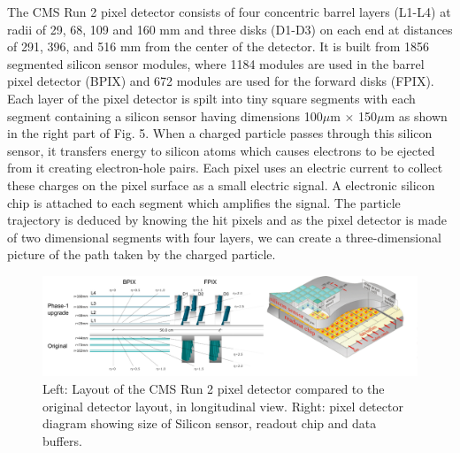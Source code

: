 The CMS Run 2 pixel detector consists of four concentric barrel layers (L1-L4) at radii of 29, 68, 109 and 160 mm and three disks (D1-D3) on each end at distances of 291, 396, and 516 mm from the center of the detector. It is built from 1856 segmented silicon sensor modules, where 1184 modules are used in the barrel pixel detector (BPIX) and 672 modules are used for the forward disks (FPIX). \\

Each layer of the pixel detector is spilt into tiny square segments with each segment containing a silicon sensor having dimensions 100$\mu$m $\times$ 150$\mu$m as shown in the right part of Fig. 5. When a charged particle passes through this silicon sensor, it transfers energy to silicon atoms which causes electrons to be ejected from it creating electron-hole pairs. Each pixel uses an electric current to collect these charges on the pixel surface as a small electric signal. A electronic silicon chip is attached to each segment which amplifies the signal. The particle trajectory is deduced by knowing the hit pixels and as the pixel detector is made of two dimensional segments with four layers, we can create a three-dimensional picture of the path taken by the charged particle.



\begin{figure}[H]
  \centering
  \includegraphics[width=1 \columnwidth]{./pixeldetector_merged1.png}
  \caption{Left: Layout of the CMS Run 2 pixel detector compared to the original detector layout, in longitudinal view. Right: pixel detector diagram showing size of Silicon sensor, readout chip and data buffers.}
  \label{fig:LHC}
\end{figure}


